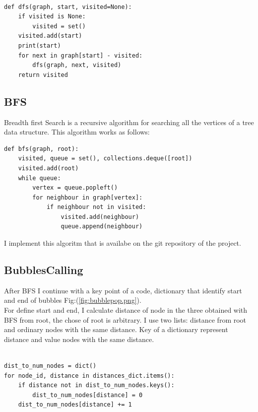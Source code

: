 \begin{verbatim}

def dfs(graph, start, visited=None):
    if visited is None:
        visited = set()
    visited.add(start)
    print(start)
    for next in graph[start] - visited:
        dfs(graph, next, visited)
    return visited

\end{verbatim}

\subsection{BFS}
Breadth first Search is a recursive algorithm for searching all the vertices of a tree data structure.
This algorithm works as follows:

\begin{verbatim}
def bfs(graph, root): 
    visited, queue = set(), collections.deque([root])
    visited.add(root)
    while queue: 
        vertex = queue.popleft()
        for neighbour in graph[vertex]: 
            if neighbour not in visited: 
                visited.add(neighbour) 
                queue.append(neighbour) 
\end{verbatim}

I implement this algoritm that is availabe on the git repository of the project. 


\subsection{BubblesCalling}

After BFS I continue with a key point of a code, dictionary that identify start and end of bubbles Fig:({\ref{fig:bubblepop.png}}).\\

For define start and end, I calculate distance of node in the three obtained with BFS from root, the chose of root is arbitrary. I use two lists: distance from root and ordinary nodes with the same distance.
Key of a dictionary represent distance and value nodes with the same distance. 

\begin{verbatim}
    
dist_to_num_nodes = dict()   
for node_id, distance in distances_dict.items():
    if distance not in dist_to_num_nodes.keys():   
        dist_to_num_nodes[distance] = 0
    dist_to_num_nodes[distance] += 1

\end{verbatim}

